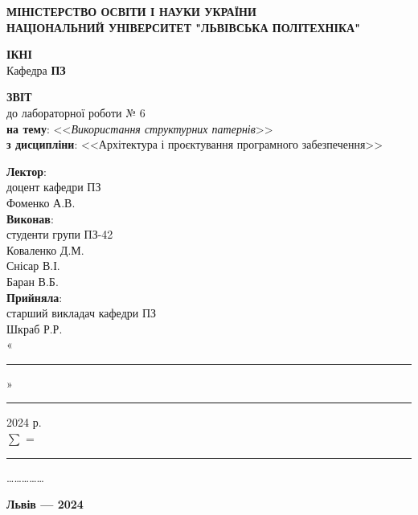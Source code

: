 \documentclass[oneside,14pt]{extarticle}
\newcommand\subject{Архітектура і проєктування програмного забезпечення}
\newcommand\lecturer{доцент кафедри ПЗ\\Фоменко А.В.}
\newcommand\teacher{старший викладач кафедри ПЗ\\Шкраб Р.Р.}
\newcommand\mygroup{ПЗ-42}
\newcommand\lab{6}
\newcommand\theme{Використання структурних патернів}
\begin{document}
\begin{normalsize}
	\begin{titlepage}
		\thispagestyle{empty}
		\begin{center}
			\textbf{МІНІСТЕРСТВО ОСВІТИ І НАУКИ УКРАЇНИ\\
				НАЦІОНАЛЬНИЙ УНІВЕРСИТЕТ "ЛЬВІВСЬКА ПОЛІТЕХНІКА"}
		\end{center}
		\begin{flushright}
			\textbf{ІКНІ}\\
			Кафедра \textbf{ПЗ}
		\end{flushright}
		\vspace{80pt}
		\begin{center}
			\textbf{ЗВІТ}\\
			\vspace{10pt}
			до лабораторної роботи № \lab\\
			\textbf{на тему}: <<\textit{\theme}>>\\
			\textbf{з дисципліни}: <<\subject>>
		\end{center}
		\vspace{80pt}
		\begin{flushright}
			
			\textbf{Лектор}:\\
			\lecturer\\
			\vspace{28pt}
			\textbf{Виконав}:\\
			
			студенти групи \mygroup\\
			Коваленко Д.М.\\
			Снісар В.І.\\
			Баран В.Б.\\
			\vspace{28pt}
			\textbf{Прийняла}:\\
			
			\teacher\\
			
			\vspace{28pt}
			«\rule{1cm}{0.15mm}» \rule{1.5cm}{0.15mm} 2024 р.\\
			$\sum$ = \rule{1cm}{0.15mm}……………\\
			
		\end{flushright}
		\vspace{\fill}
		\begin{center}
			\textbf{Львів — 2024}
		\end{center}
	\end{titlepage}
		

\end{normalsize}
\end{document}
